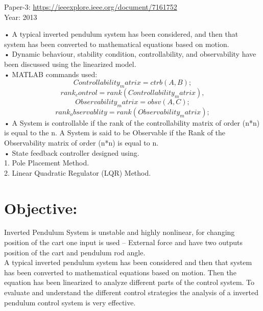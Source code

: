 \documentclass[11pt]{article}
\begin{document}
\begin{flushleft}
{\large Paper-3:}{ \url{ https://ieeexplore.ieee.org/document/7161752}\\
Year: 2013}
\end{flushleft}
{•	A typical inverted pendulum system has been considered, and then that system has been converted to mathematical equations based on motion.\\
•	Dynamic behaviour, stability condition, controllability, and observability have been discussed using the linearized model.\\
•	MATLAB commands used:}
                   $$Controllability_matrix=ctrb(A,B);$$
                   $$rank_control=rank(Controllability_matrix),$$ 
                   $$Observability_matrix = obsv(A,C);$$
                   $$rank_observablity=rank(Observability_matrix);$$
{•	A System is controllable if the rank of the controllability matrix of order (n*n) is equal to the n. A System is said to be Observable if the Rank of the Observability matrix of order (n*n) is equal to n.\\
•	State feedback controller designed using.\\
1.	Pole Placement Method.\\
2.	Linear Quadratic Regulator (LQR) Method.\\}



\newpage
\section{Objective:}
\begin{flushleft}
{Inverted Pendulum System is unstable and highly nonlinear, for changing position of the cart one input is used – External force and have two outputs position of the cart and pendulum rod angle. \\
A typical inverted pendulum system has been considered and then that system has been converted to mathematical equations based on motion. Then the equation has been linearized to analyze different parts of the control system. To evaluate and understand the different control strategies the analysis of a inverted pendulum control system is very effective.}
\end{flushleft}
\end{document}
